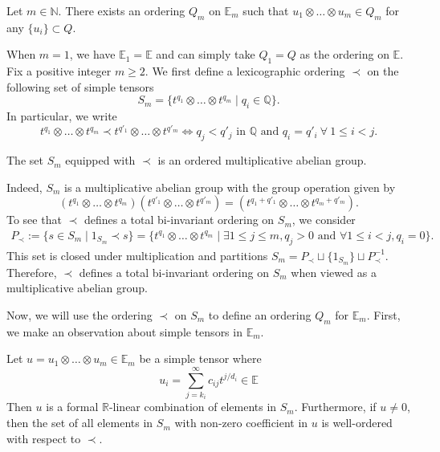 \documentclass{amsart}
\makeatletter
\renewenvironment{proof}[1][\proofname]{%
   \par\pushQED{\qed}\normalfont%
   \topsep6\p@\@plus6\p@\relax
   \trivlist\item[\hskip\labelsep\bfseries#1\@addpunct{.}]%
   \ignorespaces
}{%
   \popQED\endtrivlist\@endpefalse
}
\makeatother
\begin{document}
\begin{prop}
    \label{prop:OrderingOnTensorPowerOfPuiseuxField}
    Let $m \in \mathbb{N}$. There exists an ordering $Q_m$ on $\mathbb{E}_m$ such that $u_1\otimes \dots \otimes u_m \in  Q_m$ for any $ \{u_i\}\subset Q$.
\end{prop}

\begin{proof}[Proof of \cref{prop:OrderingOnTensorPowerOfPuiseuxField}]
    When $m =1$, we have $\mathbb{E}_1 = \mathbb{E}$ and can simply take $Q_1 = Q$ as the ordering on $\mathbb{E}$. Fix a positive integer $m\geq 2$. We first define a lexicographic ordering $\prec$ on the following set of simple tensors
    \[
    S_m = \{t^{q_1} \otimes \dots \otimes t^{q_m} \mid q_i \in \mathbb{Q}\}.
    \]
    In particular, we write  
    \[
    t^{q_1} \otimes \dots \otimes t^{q_m} \prec t^{q'_1} \otimes \dots \otimes t^{q'_m} \Leftrightarrow q_{j} < q'_j \text{ in } \mathbb{Q} \text{ and } q_i = q'_i \ \forall \ 1 \leq i < j. 
    \]
    \begin{lem}
        The set $S_m$ equipped with $\prec$ is an ordered multiplicative abelian group.
    \end{lem}
    \begin{proof}
        Indeed, $S_m$ is a multiplicative abelian group with the group operation given by 
        \[
        (t^{q_1} \otimes \dots \otimes t^{q_m})(t^{q'_1} \otimes \dots \otimes t^{q'_m}) = (t^{q_1+q'_1} \otimes \dots \otimes t^{q_m+q'_m}).
        \]
        To see that $\prec$ defines a total bi-invariant ordering on $S_m$, we consider
        \begin{align*}
    P_{\prec} := \{s\in S_m \mid 1_{S_m} \prec s\} = \{t^{q_1} \otimes \dots \otimes t^{q_m} \mid \exists 1\leq j \leq m, q_j >0 \text{ and } \forall 1 \leq i <j, q_i = 0 \}.    
    \end{align*}
    This set is closed under multiplication and partitions $S_m = P_{\prec} \sqcup \{1_{S_m}\}\sqcup P_{\prec}^{-1}$. Therefore, $\prec$ defines a total bi-invariant ordering on $S_m$ when viewed as a multiplicative abelian group. 
    \end{proof}
    
    Now, we will use the ordering $\prec$ on $S_m$ to define an ordering $Q_m$ for $\mathbb{E}_m$. First, we make an observation about simple tensors in $\mathbb{E}_m$.

    \begin{lem}
        Let $u = u_1 \otimes \dots \otimes u_m \in \mathbb{E}_m$ be a simple tensor where
        \[
        u_i =\sum\limits_{j=k_i}^{\infty} c_{ij}t^{j/d_i} \in \mathbb{E}
        \]
        Then $u$ is a formal $\mathbb{R}$-linear combination of elements in $S_m$. Furthermore, if $u\neq 0$, then the set of all elements in $S_m$ with non-zero coefficient in $u$ is well-ordered with respect to $\prec$. 
    \end{lem}


\end{proof}
\end{document}
